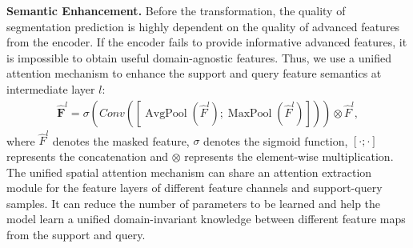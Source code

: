 \documentclass{bmvc2k}
\begin{document}
\textbf{Semantic Enhancement. }Before the transformation, the quality of segmentation prediction is highly dependent on the quality of advanced features from the encoder. 
If the encoder fails to provide informative advanced features, it is impossible to obtain useful domain-agnostic features. 
Thus, we use a unified attention mechanism \cite{woo2018cbam} to enhance the support and query feature semantics at intermediate layer $l$:
\begin{eqnarray}
\mathbf{\hat{F}}^l=\sigma(Conv([\operatorname{AvgPool}(\hat{F}^l); \operatorname{MaxPool}(\hat{F}^l)]))\otimes \hat{F}^l,
\end{eqnarray}
where $\hat{F}^l$ denotes the masked feature, $\sigma$ denotes the sigmoid function, $[\mathbf{\cdot};\mathbf{\cdot}]$ represents the concatenation and $\otimes$ represents the element-wise multiplication. 
The unified spatial attention mechanism can share an attention extraction module for the feature layers of different feature channels and support-query samples. 
It can reduce the number of parameters to be learned and help the model learn a unified domain-invariant knowledge between different feature maps from the support and query.
\end{document}
